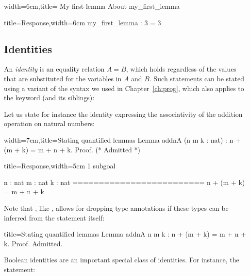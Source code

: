 \begin{coq}{width=6cm,title= My first lemma}
About my_first_lemma
\end{coq}
\begin{coqout}{title=Response,width=6cm}
my_first_lemma : 3 = 3
\end{coqout}


\subsection{Identities}\label{ssec:id}


An \emph{identity} is an equality relation $A = B$, which holds
regardless of the values that are substituted for the variables in $A$
and $B$. Such statements can be stated using a variant of the
 syntax we used in Chapter~\ref{ch:prog}, which also
applies to the  keyword (and its siblings):


Let us state for instance the identity expressing the associativity of
the  addition operation on natural numbers:

\begin{coq}{width=7cm,title=Stating quantified lemmas}
Lemma addnA (n m k : nat) :
  n + (m + k) = m + n + k.
Proof.
(* Admitted *)
\end{coq}
\begin{coqout}{title=Response,width=5cm}
1 subgoal

 n : nat
 m : nat
 k : nat
 =========================
  n + (m + k) = m + n + k
\end{coqout}

Note that , like , allows for dropping type
annotations if these types can be inferred from the statement itself:

\begin{coq}{title=Stating quantified lemmas}
Lemma addnA n m k : n + (m + k) = m + n + k.
Proof. Admitted.
\end{coq}


Boolean identities are an important special class of identities. For
instance, the~ statement:

